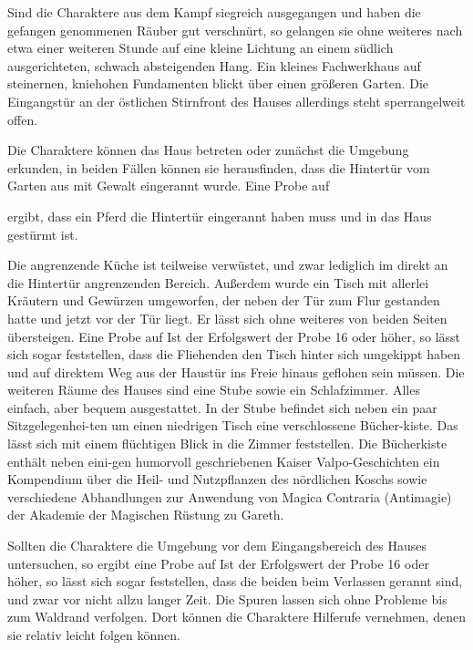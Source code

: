 


Sind die Charaktere aus dem Kampf siegreich ausgegangen und haben die gefangen genommenen Räuber gut verschnürt, so gelangen sie ohne weiteres nach etwa einer weiteren Stunde auf eine kleine Lichtung an einem südlich ausgerichteten, schwach absteigenden Hang. Ein kleines Fachwerkhaus auf steinernen, kniehohen Fundamenten blickt über einen größeren Garten. Die Eingangstür an der östlichen Stirnfront des Hauses allerdings steht sperrangelweit offen.


Die Charaktere können das Haus betreten oder zunächst die Umgebung erkunden, in beiden Fällen können sie herausfinden, dass die Hintertür vom Garten aus mit Gewalt eingerannt wurde. Eine Probe auf 



ergibt, dass ein Pferd die Hintertür eingerannt haben muss und in das Haus gestürmt ist. 


Die angrenzende Küche ist teilweise verwüstet, und zwar lediglich im direkt an die Hintertür angrenzenden Bereich. Außerdem wurde ein Tisch mit allerlei Kräutern und Gewürzen umgeworfen, der neben der Tür zum Flur gestanden hatte und jetzt vor der Tür liegt. Er lässt sich ohne weiteres von beiden Seiten übersteigen. Eine Probe auf 
\platz
{}
\platz
Ist der Erfolgswert der Probe 16 oder höher, so lässt sich sogar feststellen, dass die Fliehenden den Tisch hinter sich umgekippt haben und auf direktem Weg aus der Haustür ins Freie hinaus geflohen sein müssen. 
\platz
Die weiteren Räume des Hauses sind eine Stube sowie ein Schlafzimmer. Alles einfach, aber bequem ausgestattet. In der Stube befindet sich neben ein paar Sitzgelegenhei-ten um einen niedrigen Tisch eine verschlossene Bücher-kiste. Das lässt sich mit einem flüchtigen Blick in die Zimmer feststellen. Die Bücherkiste enthält neben eini-gen humorvoll geschriebenen Kaiser Valpo-Geschichten ein Kompendium über die Heil- und Nutzpflanzen des nördlichen Koschs sowie verschiedene Abhandlungen zur Anwendung von Magica Contraria (Antimagie) der Akademie der Magischen Rüstung zu Gareth.

Sollten die Charaktere die Umgebung vor dem Eingangsbereich des Hauses untersuchen, so ergibt eine Probe auf 
\platz
{}
\platz
Ist der Erfolgswert der Probe 16 oder höher, so lässt sich sogar feststellen, dass die beiden beim Verlassen gerannt sind, und zwar vor nicht allzu langer Zeit. Die Spuren lassen sich ohne Probleme bis zum Waldrand verfolgen. Dort können die Charaktere Hilferufe vernehmen, denen sie relativ leicht folgen können.

